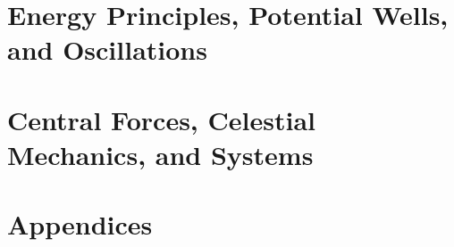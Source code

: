 \documentclass[11pt,oneside,openany]{book}
\begin{document}
\part{Energy Principles, Potential Wells, and Oscillations}






\part{Central Forces, Celestial Mechanics, and Systems}




\appendix
\part*{Appendices}



\end{document}
